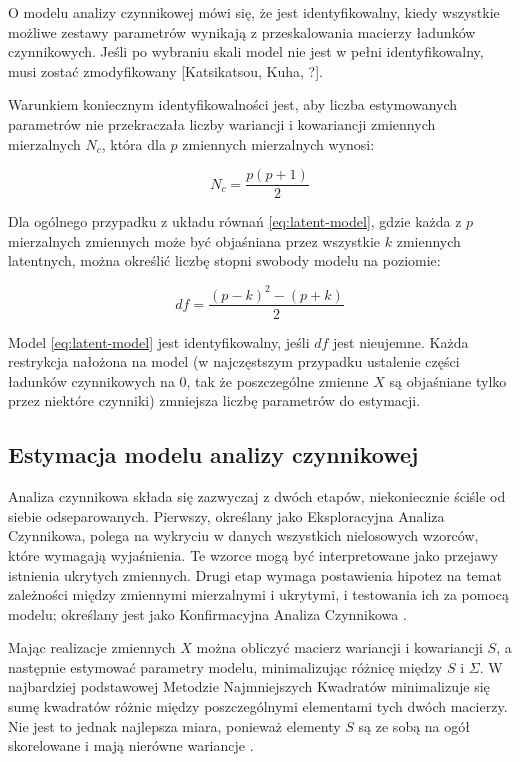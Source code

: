 \documentclass[12pt]{article}
\begin{document}
O modelu analizy czynnikowej mówi się, że jest identyfikowalny, kiedy wszystkie możliwe zestawy parametrów wynikają z przeskalowania macierzy ładunków czynnikowych. Jeśli po wybraniu skali model nie jest w pełni identyfikowalny, musi zostać zmodyfikowany {[}Katsikatsou, Kuha, ?{]}.

Warunkiem koniecznym identyfikowalności jest, aby liczba estymowanych parametrów nie przekraczała liczby wariancji i kowariancji zmiennych mierzalnych \(N_c\), która dla \(p\) zmiennych mierzalnych wynosi:

\begin{equation}
\label{eq:ident-condition}
N_c = \frac{p(p+1)}{2}
\end{equation}

Dla ogólnego przypadku z układu równań \ref{eq:latent-model}, gdzie każda z \(p\) mierzalnych zmiennych może być objaśniana przez wszystkie \(k\) zmiennych latentnych, można określić liczbę stopni swobody modelu na poziomie:

\begin{equation}
\label{eq:df}
df = \frac{(p-k)^2 - (p+k)}{2}
\end{equation}

Model \ref{eq:latent-model} jest identyfikowalny, jeśli \(df\) jest nieujemne. Każda restrykcja nałożona na model (w najczęstszym przypadku ustalenie części ładunków czynnikowych na 0, tak że poszczególne zmienne \(X\) są objaśniane tylko przez niektóre czynniki) zmniejsza liczbę parametrów do estymacji.

\hypertarget{estymacja-modelu-analizy-czynnikowej}{%
\subsection{Estymacja modelu analizy czynnikowej}\label{estymacja-modelu-analizy-czynnikowej}}

Analiza czynnikowa składa się zazwyczaj z dwóch etapów, niekoniecznie ściśle od siebie odseparowanych. Pierwszy, określany jako Eksploracyjna Analiza Czynnikowa, polega na wykryciu w danych wszystkich nielosowych wzorców, które wymagają wyjaśnienia. Te wzorce mogą być interpretowane jako przejawy istnienia ukrytych zmiennych. Drugi etap wymaga postawienia hipotez na temat zależności między zmiennymi mierzalnymi i ukrytymi, i testowania ich za pomocą modelu; określany jest jako Konfirmacyjna Analiza Czynnikowa \citep{Everitt}.

Mając realizacje zmiennych \(X\) można obliczyć macierz wariancji i kowariancji \(S\), a następnie estymować parametry modelu, minimalizując różnicę między \(S\) i \(\Sigma\). W najbardziej podstawowej Metodzie Najmniejszych Kwadratów minimalizuje się sumę kwadratów różnic między poszczególnymi elementami tych dwóch macierzy. Nie jest to jednak najlepsza miara, ponieważ elementy \(S\) są ze sobą na ogół skorelowane i mają nierówne wariancje \citep{Everitt}.
\end{document}
